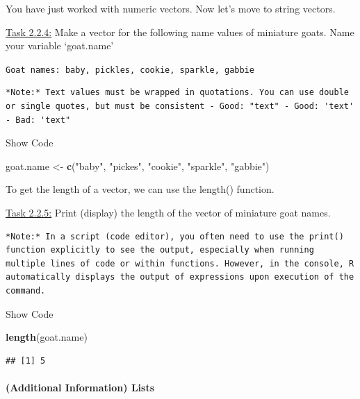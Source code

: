 \documentclass[
]{article}
\newenvironment{Shaded}{\begin{snugshade}}{\end{snugshade}}
\newcommand{\FunctionTok}[1]{\textcolor[rgb]{0.13,0.29,0.53}{\textbf{#1}}}
\newcommand{\NormalTok}[1]{#1}
\newcommand{\OtherTok}[1]{\textcolor[rgb]{0.56,0.35,0.01}{#1}}
\newcommand{\StringTok}[1]{\textcolor[rgb]{0.31,0.60,0.02}{#1}}
\begin{document}
You have just worked with numeric vectors. Now let's move to string
vectors.

\ul{Task 2.2.4:} Make a vector for the following name values of
miniature goats. Name your variable `goat.name'

\texttt{Goat\ names:\ baby,\ pickles,\ cookie,\ sparkle,\ gabbie}

\begin{verbatim}
*Note:* Text values must be wrapped in quotations. You can use double or single quotes, but must be consistent - Good: "text" - Good: 'text' - Bad: 'text"
\end{verbatim}

Show Code

\begin{Shaded}
\begin{Highlighting}[]
\NormalTok{goat.name }\OtherTok{\textless{}{-}} \FunctionTok{c}\NormalTok{(}\StringTok{"baby"}\NormalTok{, }\StringTok{"pickes"}\NormalTok{, }\StringTok{"cookie"}\NormalTok{, }\StringTok{"sparkle"}\NormalTok{, }\StringTok{"gabbie"}\NormalTok{)}
\end{Highlighting}
\end{Shaded}

To get the length of a vector, we can use the length() function.

\ul{Task 2.2.5:} Print (display) the length of the vector of miniature
goat names.

\begin{verbatim}
*Note:* In a script (code editor), you often need to use the print() function explicitly to see the output, especially when running multiple lines of code or within functions. However, in the console, R automatically displays the output of expressions upon execution of the command.
\end{verbatim}

Show Code

\begin{Shaded}
\begin{Highlighting}[]
\FunctionTok{length}\NormalTok{(goat.name)}
\end{Highlighting}
\end{Shaded}

\begin{verbatim}
## [1] 5
\end{verbatim}

\hypertarget{additional-information-lists}{%
\paragraph{(Additional Information)
Lists}\label{additional-information-lists}}
\end{document}
